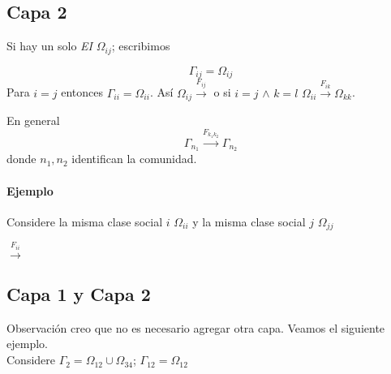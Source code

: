 \documentclass[]{article}
\begin{document}
\subsection{Capa 2}

Si hay un solo \emph{EI}  $\Omega_{ij}$; escribimos

\begin{equation*}
\Gamma_{ij}=\Omega_{ij}
\end{equation*}
Para $i=j$ entonces $\Gamma_{ii}=\Omega_{ii}$.
As\'i $\displaystyle \Omega_{ij}{\overset{F_{ij}}{\longrightarrow}}$ o si $i=j$ $\land$ $k=l$ $\displaystyle \Omega_{ii}{\overset{F_{ik}}{\longrightarrow}}\Omega_{kk}$.\\



\begin{center}
	
\hrulefill

En general\\

\begin{equation*}
\Gamma_{n_1} \xrightarrow{F_{k_1k_2}} \Gamma_{n_2}
\end{equation*}
donde $n_1 , n_2$ identifican la comunidad.\\
\hrulefill
\end{center}


\paragraph{Ejemplo}
Considere la  misma clase social  $i$ $\Omega_{ii}$ y la misma  clase social $j$ $ \Omega_{jj}$
\begin{center}
 $\xrightarrow{F_{ii}}$ 
\end{center}
\subsection{Capa 1 y Capa 2}

\begin{center}
\cornersize*{2cm}
\end{center}

	
Observaci\'on creo que no es necesario agregar otra capa. Veamos el siguiente ejemplo.\\
Considere $\Gamma_2=\Omega_{1 2} \cup \Omega_{3 4}$; $\Gamma_{1 2}=\Omega_{1 2}$
\end{document}

